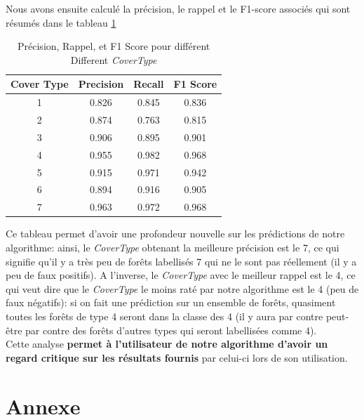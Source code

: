 \documentclass{article}
\begin{document}
Nous avons ensuite calculé la précision, le rappel et le F1-score associés qui sont résumés dans le tableau \ref{tab:cover_metrics}





\begin{table}[h]
  \centering
  \begin{tabular}{|c|c|c|c|}
    \hline
    Cover Type & Precision & Recall & F1 Score \\
    \hline
    1 & 0.826 & 0.845 & 0.836 \\
    \hline
    2 & 0.874 & 0.763 & 0.815 \\
    \hline
    3 & 0.906 & 0.895 & 0.901 \\
    \hline
    4 & 0.955 & 0.982 & 0.968 \\
    \hline
    5 & 0.915 & 0.971 & 0.942 \\
    \hline
    6 & 0.894 & 0.916 & 0.905 \\
    \hline
    7 & 0.963 & 0.972 & 0.968 \\
    \hline
  \end{tabular}
  \caption{Précision, Rappel, et F1 Score pour différent Different \textit{CoverType}}
  \label{tab:cover_metrics}
\end{table}

Ce tableau permet d'avoir une profondeur nouvelle sur les prédictions de notre algorithme: ainsi, le \textit{CoverType} obtenant la meilleure précision est le 7, ce qui signifie qu'il y a très peu de forêts labellisés 7 qui ne le sont pas réellement (il y a peu de faux positifs). A l'inverse, le \textit{CoverType} avec le meilleur rappel est le 4, ce qui veut dire que le \textit{CoverType} le moins raté par notre algorithme est le 4 (peu de faux négatifs): si on fait une prédiction sur un ensemble de forêts, quasiment toutes les forêts de type 4 seront dans la classe des 4 (il y aura par contre peut-être par contre des forêts d'autres types qui seront labellisées comme 4). \\

Cette analyse \textbf{permet à l'utilisateur de notre algorithme d'avoir un regard critique sur les résultats fournis} par celui-ci lors de son utilisation. 




\newpage

\section{Annexe}
\end{document}
